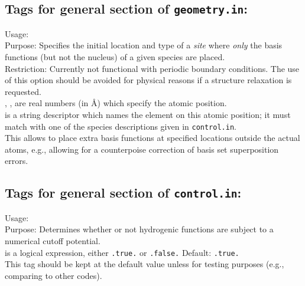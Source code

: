 \newpage

\subsection*{Tags for general section of \texttt{geometry.in}:}

{
  \noindent
  Usage:    
   \\[1.0ex]
  Purpose: Specifies the initial location and type of a \emph{site}
  where \emph{only} the basis functions (but not the nucleus) of a
  given species are placed.
  \\[1.0ex]
  Restriction: Currently not functional with periodic boundary
    conditions. The use of this option should be avoided for physical
    reasons if a structure relaxation is requested.\\[1.0ex]
  , ,  are real numbers (in \AA) which
  specify the atomic position. \\
   is a string descriptor which names the element on
    this atomic position; it must match with one of the species descriptions
    given in \texttt{control.in}. \\
}
This allows to place extra basis functions at specified locations
outside the actual atoms, e.g., allowing for a counterpoise
correction of basis set superposition errors.

\newpage

\subsection*{Tags for general section of \texttt{control.in}:}

{
  \noindent
  Usage:   \\[1.0ex]
  Purpose: Determines whether or not hydrogenic functions are subject
    to a numerical cutoff potential. \\[1.0ex] 
   is a logical expression, either \texttt{.true.} or
    \texttt{.false.} Default: \texttt{.true.} \\
}
This tag should be kept at the default value unless for testing
purposes (e.g., comparing to other codes). 

